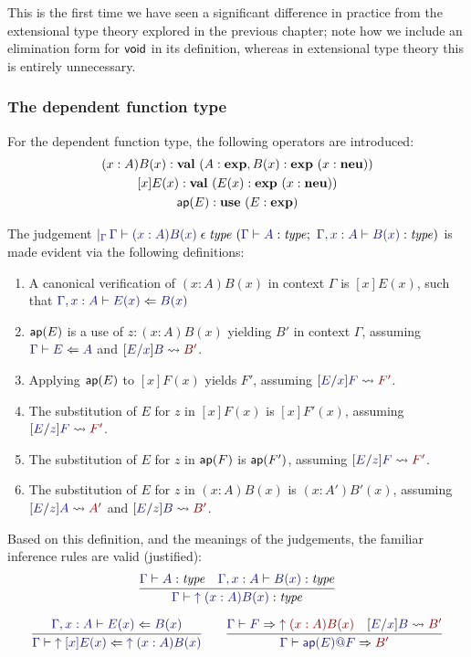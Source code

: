 \documentclass[main.tex]{subfiles}
\begin{document}
This is the first time we have seen a significant difference in
practice from the extensional type theory explored in the previous
chapter; note how we include an elimination form for $\mathsf{void}$ in its
definition, whereas in extensional type theory this is entirely
unnecessary.

\subsubsection{The dependent function type}
For the dependent function type, the following operators are introduced:
\begin{gather*}
  \hyp{(x:A)B(x) : \val}{A:\mtm, \hyp{B(x):\mtm}{x:\rtm}}\\
  \hyp{[x]E(x) : \val}{\hyp{E(x):\mtm}{x:\rtm}}\\
  \hyp{\uap{E}:\utm}{E:\mtm}
\end{gather*}

The judgement
$\genj{\Gamma}{%
  \hyp{%
    \lfsequent\Gamma{
      \cantype{(x:A)B(x)}%
    }
  }{%
    \lfsequent\Gamma{\type{A}};\ %
    \lfsequent{\Gamma,x:A}{\type{B(x)}}
  }%
}$
is made evident via the following definitions:
\begin{enumerate}
  \item A canonical verification of $(x:A)B(x)$ in context $\Gamma$ is
$[x]E(x)$, such that $\lfsequent{\Gamma,x:A}{\checks{E(x)}{B(x)}}$
  \item $\mathsf{ap}(E)$ is a use of $z:(x:A)B(x)$ yielding $B'$ in context $\Gamma$, assuming $\lfsequent\Gamma\checks{E}{A}$ and $\hsubste{E}{x}{B}{B'}$.
  \item Applying $\mathsf{ap}(E)$ to $[x]F(x)$ yields $F'$, assuming $\hsubste{E}{x}{F}{F'}$.
  \item The substitution of $E$ for $z$ in $[x]F(x)$ is $[x]F'(x)$, assuming $\hsubste{E}{z}{F}{F'}$.
  \item The substitution of $E$ for $z$ in $\mathsf{ap}(F)$ is $\mathsf{ap}(F')$, assuming $\hsubste{E}{z}{F}{F'}$.
  \item The substitution of $E$ for $z$ in $(x:A)B(x)$ is $(x:A')B'(x)$, assuming $\hsubste{E}{z}{A}{A'}$ and $\hsubste{E}{z}{B}{B'}$.
\end{enumerate}

Based on this definition, and the meanings of the judgements, the
familiar inference rules are valid (justified):
\begin{gather*}
  \infer{
    \lfsequent\Gamma\type{\ival{(x:A)B(x)}}
  }{
    \lfsequent\Gamma\type{A} &
    \lfsequent{\Gamma,x:A}\type{B(x)}
  }\\[6pt]
  \infer{
    \lfsequent\Gamma\checks{\ival{[x]E(x)}}{\ival{(x:A)B(x)}}
  }{
    \lfsequent{\Gamma,x:A}\checks{E(x)}{B(x)}
  }
  \qquad
  \infer{
    \lfsequent\Gamma\infers{\elim{\uap{E}}{F}}{B'}
  }{
    \lfsequent\Gamma\infers{F}{\ival{(x:A)B(x)}} &
    \hsubste{E}{x}{B}{B'}
  }
\end{gather*}
\end{document}
